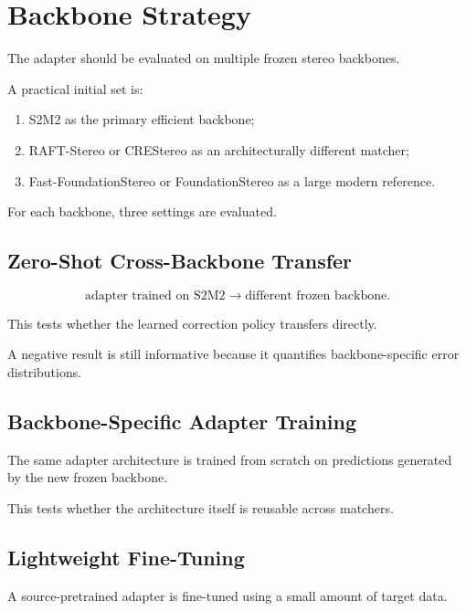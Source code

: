 \documentclass[11pt,a4paper]{article}
\newcommand{\smodel}{S2M2}
\begin{document}
\section{Backbone Strategy}

The adapter should be evaluated on multiple frozen stereo backbones.

A practical initial set is:

\begin{enumerate}[leftmargin=*]
    \item \smodel{} as the primary efficient backbone;
    \item RAFT-Stereo or CREStereo as an architecturally different matcher;
    \item Fast-FoundationStereo or FoundationStereo as a large modern reference.
\end{enumerate}

For each backbone, three settings are evaluated.

\subsection{Zero-Shot Cross-Backbone Transfer}

\begin{equation}
    \text{adapter trained on \smodel}
    \longrightarrow
    \text{different frozen backbone}.
\end{equation}

This tests whether the learned correction policy transfers directly.

A negative result is still informative because it quantifies backbone-specific
error distributions.

\subsection{Backbone-Specific Adapter Training}

The same adapter architecture is trained from scratch on predictions generated by
the new frozen backbone.

This tests whether the architecture itself is reusable across matchers.

\subsection{Lightweight Fine-Tuning}

A source-pretrained adapter is fine-tuned using a small amount of target data.
\end{document}
